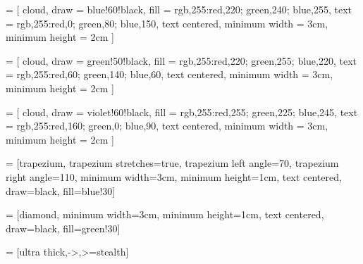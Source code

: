  = [
    cloud,
    draw = blue!60!black,
    fill = {rgb,255:red,220; green,240; blue,255}, %
    text = {rgb,255:red,0; green,80; blue,150},    %
    text centered,
    minimum width = 3cm,
    minimum height = 2cm
]

 = [
    cloud,
    draw = green!50!black,
    fill = {rgb,255:red,220; green,255; blue,220},   %
    text = {rgb,255:red,60; green,140; blue,60},     %
    text centered,
    minimum width = 3cm,
    minimum height = 2cm
]


 = [
    cloud,
    draw = violet!60!black,
    fill = {rgb,255:red,255; green,225; blue,245}, %
    text = {rgb,255:red,160; green,0; blue,90},   %
    text centered,
    minimum width = 3cm,
    minimum height = 2cm
]

 = [trapezium, 
trapezium stretches=true, %
trapezium left angle=70, 
trapezium right angle=110, 
minimum width=3cm, 
minimum height=1cm, text centered, 
draw=black, fill=blue!30]

 = [diamond, 
minimum width=3cm, 
minimum height=1cm, 
text centered, 
draw=black, 
fill=green!30]

 = [ultra thick,->,>=stealth]
